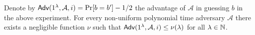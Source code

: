 \begin{definition}
\begin{itemize}
\begin{enumerate}
    \end{enumerate}
    Denote by ${\sf Adv}(1^\lambda,\mathcal{A},i)=\Pr[b=b']-1/2$ the advantage of $\mathcal{A}$ in guessing $b$ in the above experiment. For every non-uniform polynomial time adversary $\mathcal{A}$ there exists a negligible function $\nu$ such that ${\sf Adv}(1^\lambda,\mathcal{A},i) \le \nu(\lambda)$ for all $\lambda \in \mathbb{N}$.
\end{itemize}
\end{definition}

